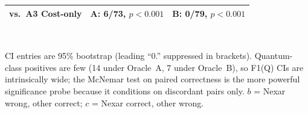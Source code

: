 \begin{table}[!t]
\begin{tabular}{@{}l@{\hskip 3pt}cccc@{}}
\quad vs.\ A3 Cost-only & \multicolumn{2}{l}{A: 6/73, $p{<}0.001$} & \multicolumn{2}{l}{B: 0/79, $p{<}0.001$} \\
\bottomrule
\end{tabular}
\\[0.50em]
{\footnotesize\raggedright CI entries are 95\% bootstrap (leading ``0.'' suppressed in brackets). Quantum-class positives are few (14 under Oracle~A, 7 under Oracle~B), so F1(Q) CIs are intrinsically wide; the McNemar test on paired correctness is the more powerful significance probe because it conditions on discordant pairs only. $b$ = Nexar wrong, other correct; $c$ = Nexar correct, other wrong.\par}
\end{table}
